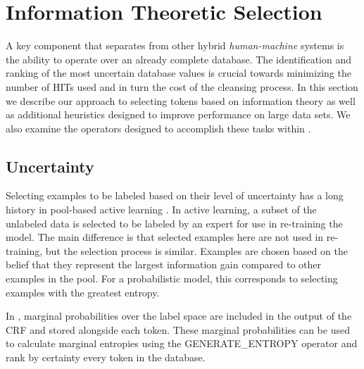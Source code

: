 \section{Information Theoretic Selection}
\label{uncertainty}




A key component that separates \sysName from other hybrid \textit{human-machine} systems is the ability to operate over an already complete database.  The identification and ranking of the most uncertain database values is crucial towards minimizing the number of HITs used and in turn the cost of the cleansing process.  In this section we describe our approach to selecting tokens based on information theory as well as additional heuristics designed to improve performance on large data sets.  We also examine the operators designed to accomplish these tasks within \sysName .

\subsection{Uncertainty}


Selecting examples to be labeled based on their level of uncertainty has a long history in pool-based active learning \cite{DBLP:conf/ijcai/EngelsonD95}. In active learning, a subset of the unlabeled data is selected to be labeled by an expert for use in re-training the model.  The main difference is that selected examples here are not used in re-training, but the selection process is similar.  Examples are chosen based on the belief that they represent the largest information gain compared to other examples in the pool.  For a probabilistic model, this corresponds to selecting examples with the greatest entropy.

In \sysName , marginal probabilities over the label space are included in the output of the CRF and stored alongside each token.  These marginal probabilities can be used to calculate marginal entropies using the GENERATE\_ENTROPY operator and rank by certainty every token in the database.

